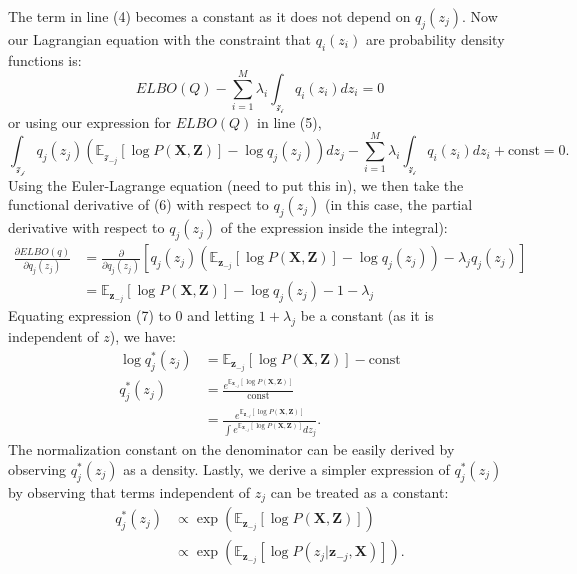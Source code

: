 \documentclass[a4paper,12pt]{article}
\begin{document}
The term in line (4) becomes a constant as it does not depend on $q_j(z_j)$. Now our Lagrangian equation with the constraint that $q_i(z_i)$ are probability density functions is:
\begin{equation*}
ELBO(Q)-\sum^M_{i=1}\lambda_i\int_\mathcal{z_i}q_i(z_i)dz_i=0
\end{equation*}
or using our expression for $ELBO(Q)$ in line (5),
\begin{equation}
\int_\mathcal{z_j}q_j(z_j)\left(\mathbb{E}_{\mathcal{z}_{-j}}[\log P(\textbf{X},\textbf{Z})]-\log q_j(z_j)\right)dz_j-\sum^M_{i=1}\lambda_i\int_\mathcal{z_i}q_i(z_i)dz_i+\text{const}=0.
\end{equation}
Using the Euler-Lagrange equation (need to put this in), we then take the functional derivative of (6) with respect to $q_j(z_j)$ (in this case, the partial derivative with respect to $q_j(z_j)$ of the expression inside the integral):
\begin{align}
\frac{\partial ELBO(q)}{\partial q_j(z_j)}&= \frac{\partial}{\partial q_j(z_j)}\left[q_j(z_j)\left(\mathbb{E}_{\textbf{z}_{-j}}[\log P(\textbf{X},\textbf{Z})]-\log q_j(z_j)\right)-\lambda_jq_j(z_j)\right]\nonumber
\\&= \mathbb{E}_{\textbf{z}_{-j}}[\log P(\textbf{X},\textbf{Z})]-\log q_j(z_j)-1-\lambda_j
\end{align}
Equating expression (7) to 0 and letting $1+\lambda_j$ be a constant (as it is independent of $z$), we have:
\begin{align*}
\log q_j^*(z_j)&= \mathbb{E}_{\textbf{z}_{-j}}[\log P(\textbf{X},\textbf{Z})]-\text{const}\\
q_j^*(z_j)&=\frac{e^{\mathbb{E}_{\textbf{z}_{-j}}[\log P(\textbf{X},\textbf{Z})]}}{\text{const}}\\
&= \frac{e^{\mathbb{E}_{\textbf{z}_{-j}}[\log P(\textbf{X},\textbf{Z})]}}{\int e^{\mathbb{E}_{\textbf{z}_{-j}}[\log P(\textbf{X},\textbf{Z})]}dz_j}.
\end{align*}
The normalization constant on the denominator can be easily derived by observing $q^*_j(z_j)$ as a density. Lastly, we derive a simpler expression of $q^*_j(z_j)$ by observing that terms independent of $z_j$ can be treated as a constant:
\begin{align}
q^*_j(z_j)&\propto \exp\left(\mathbb{E}_{\textbf{z}_{-j}}[\log P(\textbf{X},\textbf{Z})]\right)\nonumber\\
&\propto \exp\left(\mathbb{E}_{\textbf{z}_{-j}}[\log P(z_j|\textbf{z}_{-j},\textbf{X})]\right).
\end{align}
\end{document}
